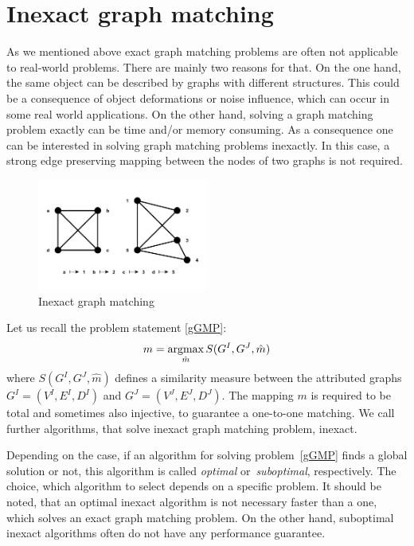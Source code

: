 \section{Inexact graph matching}
As we mentioned above exact graph matching problems are often not applicable to real-world problems. There are mainly two reasons for that. %
On the one hand, the same object can be described by graphs with different structures. %
This could be a consequence of object deformations or noise influence, which can occur in some real world applications. On the other hand, solving a graph matching problem exactly can be time and/or memory consuming. As a consequence one can be interested in solving graph matching problems inexactly. In this case, a strong edge preserving mapping between the nodes of two graphs is not required.

\vspace{-12pt}
\begin{figure}[htb]
	\centering
	\includegraphics[width=0.5\textwidth]{chapter1/fig/inexactGM}
    \caption{Inexact graph matching}
    \label{fig:inexact_GM}
\end{figure}
\vspace{-10pt}
Let us recall the problem statement \eqref{gGMP}: 
\begin{equation*}
m = \mathop{\rm argmax}_{\hat{m}}S(G^I, G^J, \hat{m})
\end{equation*}
where $S(G^I, G^J, \hat{m})$ defines a similarity measure between the attributed graphs $G^I = (V^I, E^I,D^I)$ and $G^J = (V^J, E^J,D^J)$. The mapping $m$ is required to be total and sometimes also injective, to guarantee a one-to-one matching. We call further algorithms, that solve inexact graph matching problem, inexact.

Depending on the case, if an algorithm for solving problem~\eqref{gGMP} finds a global solution or not, this algorithm is called \emph{optimal} or~\emph{suboptimal}, respectively. The choice, which algorithm to select depends on a specific problem. It should be noted, that an optimal inexact algorithm is not necessary faster than a one, which solves an exact graph matching problem. On the other hand, suboptimal inexact algorithms often do not have any performance guarantee.

